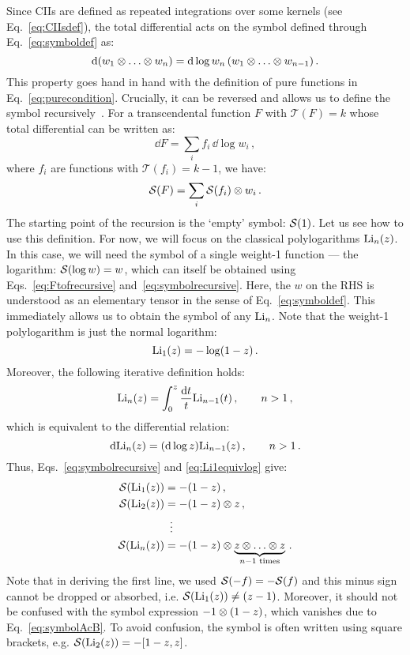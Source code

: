 \documentclass[main.tex]{subfiles}
\begin{document}
Since CIIs are defined as repeated integrations over some kernels (see Eq.~\ref{eq:CIIsdef}), the total differential acts on the symbol defined through Eq.~\ref{eq:symboldef} as:
\begin{equation} \label{eq:symboldiff}
    \mathrm{d} (w_1 \otimes \ldots \otimes w_n) = \mathrm{d} \log w_n \, (w_1 \otimes \ldots \otimes w_{n-1})\,.
\end{equation}
This property goes hand in hand with the definition of pure functions in Eq.~\ref{eq:purecondition}. Crucially, it can be reversed and allows us to define the symbol recursively~\cite{Goncharov:2010jf}. For a transcendental function $F$ with $\mathcal{T}(F) = k$ whose total differential can be written as:
\begin{equation} \label{eq:Ftofrecursive}
    \dd F = \sum_i f_i \, \dd \log w_i\,,
\end{equation}
where $f_i$ are functions with $\mathcal{T}(f_i)=k-1$, we have:
\begin{equation} \label{eq:symbolrecursive}
    \mathcal{S}(F) = \sum_i \mathcal{S}(f_i)\otimes w_i \,.
\end{equation}
The starting point of the recursion is the `empty' symbol: $\mathcal{S}(1)$. Let us see how to use this definition. For now, we will focus on the classical polylogarithms $\text{Li}_n(z)$. In this case, we will need the symbol of a single weight-1 function --- the logarithm: $\mathcal{S}(\log w) = w$, which can itself be obtained using Eqs.~\ref{eq:Ftofrecursive} and~\ref{eq:symbolrecursive}. Here, the $w$ on the RHS is understood as an elementary tensor in the sense of Eq.~\ref{eq:symboldef}. This immediately allows us to obtain the symbol of any $\text{Li}_n$. Note that the weight-1 polylogarithm is just the normal logarithm:
\begin{equation} \label{eq:Li1equivlog}
    \text{Li}_1(z) = -\log (1-z)\,. 
\end{equation}
Moreover, the following iterative definition holds:
\begin{equation} \label{eq:Liiterative}
    \text{Li}_n(z) = \int_0^z \frac{\mathrm{d} t}{t} \text{Li}_{n-1}(t)\,, \qquad n>1\,,
\end{equation}
which is equivalent to the differential relation:
\begin{equation}
    \mathrm{d} \text{Li}_n(z) = (\mathrm{d} \log z) \text{Li}_{n-1}(z) \,, \qquad n>1\,.
\end{equation}
Thus, Eqs.~\ref{eq:symbolrecursive} and \ref{eq:Li1equivlog} give:
\begin{align} \label{eq:Lisymbols}
    \mathcal{S}(\text{Li}_1(z)) &= -(1-z)\,, \nonumber \\
    \mathcal{S}(\text{Li}_2(z)) &= -(1-z) \otimes z \,, \nonumber \\
    &\,\,\, \vdots \nonumber \\
    \mathcal{S}(\text{Li}_n(z)) &= -(1-z) \otimes \underbrace{z \otimes \ldots \otimes z}_{n-1 \text{ times}}\,.
\end{align}
Note that in deriving the first line, we used $\mathcal{S}(-f) = -\mathcal{S}(f)$ and this minus sign cannot be dropped or absorbed, i.e. $\mathcal{S}(\text{Li}_1(z)) \neq (z-1)$. Moreover, it should not be confused with the symbol expression $-1 \otimes (1-z)$, which vanishes due to Eq.~\ref{eq:symbolAcB}. To avoid confusion, the symbol is often written using square brackets, e.g. $\mathcal{S}(\text{Li}_2(z)) = -[1-z, z]$.
\end{document}
